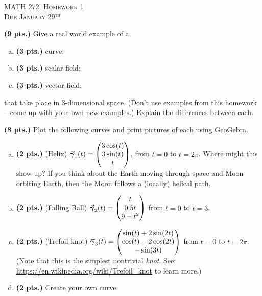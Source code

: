 \documentclass[12pt]{article} %
\begin{document}
\begin{center}
   \textsc{\large MATH 272, Homework 1}\\
   \textsc{Due January 29$^\textrm{th}$}
\end{center}
\vspace{.5cm}

\begin{problem}
\textbf{(9 pts.)} Give a real world example of a
\begin{enumerate}[(a)]
    \item \textbf{(3 pts.)} curve;
    \item \textbf{(3 pts.)} scalar field;
    \item \textbf{(3 pts.)} vector field;
\end{enumerate}
that take place in 3-dimensional space. (Don't use examples from this homework -- come up with your own new examples.) Explain the differences between each.
\end{problem}

\vspace*{0.5cm}

\begin{problem}
\textbf{(8 pts.)} Plot the following curves and print pictures of each using GeoGebra.
\begin{enumerate}[(a)]
	\item \textbf{(2 pts.)} (Helix) $\boldsymbol{\vec{\gamma}}_1(t) = \begin{pmatrix} 3\cos(t) \\ 3\sin(t) \\ t\end{pmatrix}$, from $t=0$ to $t=2\pi$. Where might this show up? If you think about the Earth moving through space and Moon orbiting Earth, then the Moon follows a (locally) helical path.

	\item \textbf{(2 pts.)} (Falling Ball) $\boldsymbol{\vec{\gamma}}_2(t) = \begin{pmatrix} t\\  0.5t \\ 9-t^2 \end{pmatrix}$ from $t=0$ to $t=3$.

	\item \textbf{(2 pts.)} (Trefoil knot) $\boldsymbol{\vec{\gamma}}_3(t) = \begin{pmatrix} \sin(t)+2\sin(2t) \\ \cos(t)-2\cos(2t) \\ -\sin(3t) \end{pmatrix}$ from $t=0$ to $t=2\pi$. (Note that this is the simplest nontrivial \emph{knot}. See: \url{https://en.wikipedia.org/wiki/Trefoil_knot} to learn more.)

	\item \textbf{(2 pts.)} Create your own curve.
\end{enumerate}
\end{problem}
\end{document}
